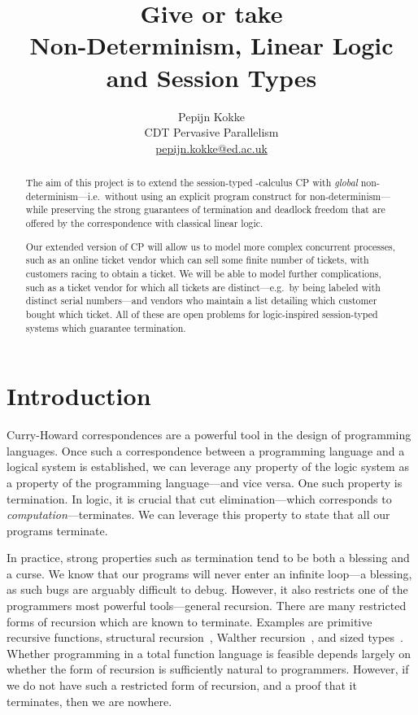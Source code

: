 \documentclass[10pt,a4paper,twocolumn,notitlepage]{article}
\title{Give or take \\
  {\large Non-Determinism, Linear Logic and Session Types}}
\author{Pepijn Kokke \\
  CDT Pervasive Parallelism \\
  \url{pepijn.kokke@ed.ac.uk}}
\begin{document}
\maketitle

\begin{abstract}
  The aim of this project is to extend the session-typed \textpi-calculus CP
  \citep{wadler2012} with \emph{global} non-determinism---i.e.\ without using an
  explicit program construct for non-determinism---while preserving the strong
  guarantees of termination and deadlock freedom that are offered by the
  correspondence with classical linear logic. 
  
  Our extended version of CP will allow us to model more complex concurrent
  processes, such as an online ticket vendor which can sell some finite number
  of tickets, with customers racing to obtain a ticket.
  We will be able to model further complications, such as a ticket vendor for
  which all tickets are distinct---e.g.\ by being labeled with distinct serial
  numbers---and vendors who maintain a list detailing which customer bought
  which ticket.
  All of these are open problems for logic-inspired session-typed systems which
  guarantee termination.
\end{abstract}

\section{Introduction}
Curry-Howard correspondences are a powerful tool in the design of programming
languages. Once such a correspondence between a programming language and a
logical system is established, we can leverage any property of the logic system
as a property of the programming language---and vice versa. One such property is
termination. In logic, it is crucial that cut elimination---which corresponds to
\emph{computation}---terminates. We can leverage this property to state that all
our programs terminate.

In practice, strong properties such as termination tend to be both a blessing
and a curse. We know that our programs will never enter an infinite loop---a
blessing, as such bugs are arguably difficult to debug. However, it also
restricts one of the programmers most powerful tools---general recursion.
There are many restricted forms of recursion which are known to
terminate. Examples are primitive recursive functions, structural
recursion~\citep{burstall1969}, Walther recursion~\citep{walther1994}, and sized
types~\citep{lee2001}. Whether programming in a total function language is
feasible depends largely on whether the form of recursion is sufficiently
natural to programmers.
However, if we do not have such a restricted form of recursion, and a proof that
it terminates, then we are nowhere.
\end{document}

